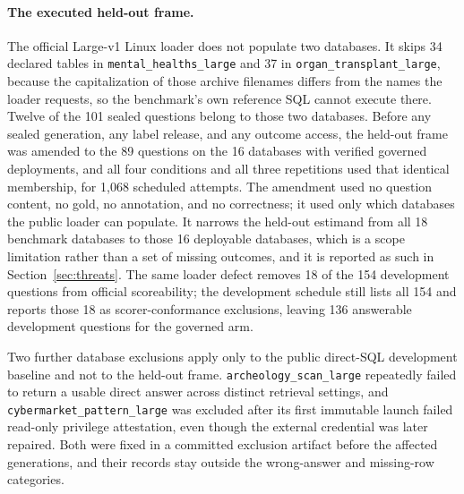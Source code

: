 \paragraph{The executed held-out frame.}
The official Large-v1 Linux loader does not populate two databases. It skips 34
declared tables in \texttt{mental\_healths\_large} and 37 in
\texttt{organ\_transplant\_large}, because the capitalization of those archive
filenames differs from the names the loader requests, so the benchmark's own
reference SQL cannot execute there. Twelve of the 101 sealed questions belong to
those two databases. Before any sealed generation, any label release, and any
outcome access, the held-out frame was amended to the 89 questions on the 16
databases with verified governed deployments, and all four conditions and all
three repetitions used that identical membership, for 1,068 scheduled attempts.
The amendment used no question content, no gold, no annotation, and no
correctness; it used only which databases the public loader can populate. It
narrows the held-out estimand from all 18 benchmark databases to those 16
deployable databases, which is a scope limitation rather than a set of missing
outcomes, and it is reported as such in Section~\ref{sec:threats}. The same
loader defect removes 18 of the 154 development questions from official
scoreability; the development schedule still lists all 154 and reports those 18
as scorer-conformance exclusions, leaving 136 answerable development questions
for the governed arm.

Two further database exclusions apply only to the public direct-SQL development
baseline and not to the held-out frame. \texttt{archeology\_scan\_large}
repeatedly failed to return a usable direct answer across distinct retrieval
settings, and \texttt{cybermarket\_pattern\_large} was excluded after its first
immutable launch failed read-only privilege attestation, even though the external
credential was later repaired. Both were fixed in a committed exclusion artifact
before the affected generations, and their records stay outside the wrong-answer
and missing-row categories.


